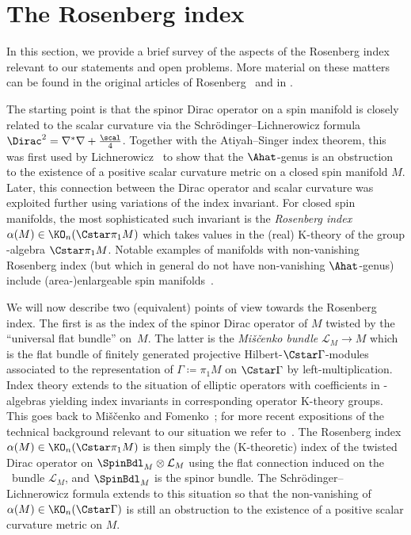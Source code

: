 \section{The Rosenberg index} \label{sec:Rosenberg-index}
In this section, we provide a brief survey of the aspects of the Rosenberg index relevant to our statements and open problems.
More material on these matters can be found in the original articles of Rosenberg~\cite{Rosenberg:PSCNovikovI,Rosenberg:PSCNovikovII,Rosenberg:PSCNovikovIII} and in \cite{RosenbergStolz:PSCSurgeryConnections,Schick:ICM,Stolz:ManifoldsOfPSC,Stolz98Concordance}.

The starting point is that the spinor Dirac operator on a spin manifold is closely related to the scalar curvature via the Schr\"odinger--Lichnerowicz formula \(\Dirac^2 = \nabla^\ast \nabla + \frac{\scal}{4}\).
Together with the Atiyah--Singer index theorem, this was first used by Lichnerowicz~\cite{Lichnerwociz:Spineurs} to show that the \(\Ahat\)-genus is an obstruction to the existence of a positive scalar curvature metric on a closed spin manifold \(M\).
Later, this connection between the Dirac operator and scalar curvature was exploited further using variations of the index invariant.
For closed spin manifolds, the most sophisticated such invariant is the \emph{Rosenberg index} \(\alpha(M) \in \KO_n(\Cstar \pi_1 M)\) which takes values in the (real) K-theory of the group \textCstar-algebra \(\Cstar \pi_1 M\).
Notable examples of manifolds with non-vanishing Rosenberg index (but which in general do not have non-vanishing \(\Ahat\)-genus) include (area-)enlargeable spin manifolds~\cite{Hanke-Kotschick-Roe-Schick:Coarse-Top-Enlargeability, HankeSchick:Enlargeable,HankeSchick:EnlargeableInfinite}.

We will now describe two (equivalent) points of view towards the Rosenberg index.
The first is as the index of the spinor Dirac operator of \(M\) twisted by the ``universal flat bundle'' on~\(M\).
The latter is the \emph{Mi\v{s}\v{c}enko bundle} \(\mathcal{L}_M \to M\) which is the flat bundle of finitely generated projective Hilbert-\(\Cstar \Gamma\)-modules associated to the representation of \(\Gamma \coloneqq \pi_1 M\) on \(\Cstar \Gamma\) by left-multiplication.
Index theory extends to the situation of elliptic operators with coefficients in \textCstar-algebras yielding index invariants in corresponding operator K-theory groups.
This goes back to Mi\v{s}\v{c}enko and Fomenko~\cite{Mishchenko-Fomenko:Index}; for more recent expositions of the technical background relevant to our situation we refer to~\cite{Ebert:EllipticRegularityDirac,HankePapeSchick:CodimensionTwoIndex}.
The Rosenberg index \(\alpha(M) \in \KO_n(\Cstar \pi_1 M)\) is then simply the (K-theoretic) index of the twisted Dirac operator on \(\SpinBdl_M \otimes \mathcal{L}_M\) using the flat connection induced on the \Mishchenko\ bundle \(\mathcal{L}_M\), and \(\SpinBdl_M\) is the spinor bundle.
The Schr\"odinger--Lichnerowicz formula extends to this situation so that the non-vanishing of \(\alpha(M) \in \KO_n(\Cstar \Gamma)\) is still an obstruction to the existence of a positive scalar curvature metric on \(M\).
